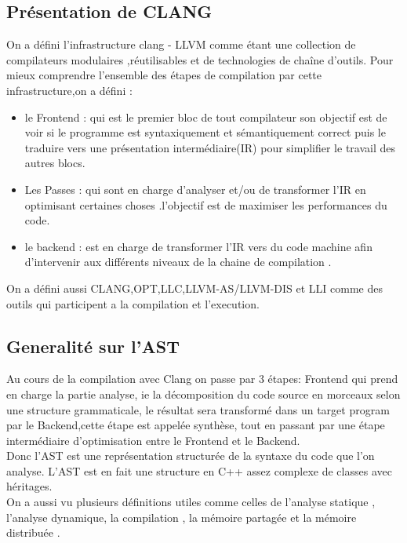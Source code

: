 \documentclass[12pt,a4paper]{article}
\begin{document}
\subsection{Présentation de CLANG \cite{clangllvm}  }

On a défini l'infrastructure clang - LLVM  comme étant une collection de compilateurs modulaires ,réutilisables et de technologies de chaîne d’outils. Pour mieux comprendre l’ensemble des étapes de compilation par cette infrastructure,on a défini :
    \begin{itemize}

    \item le Frontend : qui est le premier bloc de tout compilateur son objectif est de voir si le programme est syntaxiquement et sémantiquement correct puis le traduire vers une présentation intermédiaire(IR) pour simplifier le travail des autres blocs.
    \item Les Passes : qui sont en charge d'analyser et/ou de transformer l'IR en optimisant certaines choses .l'objectif est de maximiser les performances du code.
    \item le backend : est en charge de transformer l'IR vers du code machine afin d'intervenir aux différents niveaux de la chaine de compilation .
     \end{itemize}
 On a défini aussi CLANG,OPT,LLC,LLVM-AS/LLVM-DIS et LLI comme des outils qui participent a la compilation et l'execution.



\subsection{Generalité sur l'AST}

Au cours de la compilation avec Clang on passe par 3 étapes: Frontend qui prend en charge la partie analyse, ie la décomposition du code source en morceaux selon une structure grammaticale, le résultat sera transformé  dans un target program par le Backend,cette étape est appelée synthèse, tout en passant par une étape intermédiaire d'optimisation entre le Frontend et le Backend.\cite{Devlieghere}\\ Donc l’AST est une représentation structurée de la syntaxe du code que l’on analyse. L’AST est en fait une structure en C++ assez complexe de classes avec héritages.\\


 On a aussi vu plusieurs définitions utiles comme celles de l'analyse statique , l'analyse dynamique, la compilation , la mémoire partagée et la mémoire distribuée .
\end{document}

